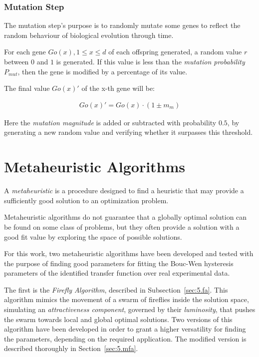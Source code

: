 \subsubsection{Mutation Step}

The mutation step's purpose is to randomly mutate some genes to reflect
the random behaviour of biological evolution through time. 

For each gene $Go(x), 1\le x \le d$ of each offspring generated,
a random value $r$ between $0$ and $1$ is generated. If this value
is less than the \textit{mutation probability} $P_{mut}$, then
the gene is modified by a percentage of its value.

The final value $Go(x)'$ of the x-th gene will be:

\begin{align*}
Go(x)' = Go(x)\cdot \left(1 \pm m_m\right)
\end{align*}

Here the \textit{mutation magnitude} is added or subtracted
with probability $0.5$, by generating a new random value and
verifying whether it surpasses this threshold.

\section{Metaheuristic Algorithms}

A \textit{metaheuristic} is a procedure designed to find a heuristic
that may provide a sufficiently good solution to an optimization problem.

Metaheuristic algorithms do not guarantee that a globally optimal solution
can be found on some class of problems, but they often provide a solution
with a good fit value by exploring the space of possible solutions.

For this work, two metaheuristic algorithms have been developed and tested
with the purpose of finding good parameters for fitting the Bouc-Wen hysteresis
parameters of the identified transfer function over real experimental data.

The first is the \textit{Firefly Algorithm}, described in Subsection~\ref{sec:5.fa}.
This algorithm mimics the movement of a swarm of fireflies inside the solution space,
simulating an \textit{attractiveness component}, governed by their \textit{luminosity},
that pushes the swarm towards local and global optimal solutions.
Two versions of this algorithm have been developed in order to grant a higher
versatility for finding the parameters, depending on the required application.
The modified version is described thoroughly in Section~\ref{sec:5.mfa}.

